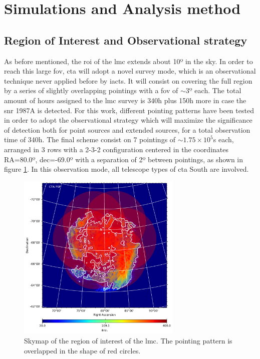 \documentclass{article}
\begin{document}
\section{Simulations and Analysis method} \label{sec:simana}

    \subsection{Region of Interest and Observational strategy}

As before mentioned, the  \gls{roi} of the \gls{lmc} extends about 10º in the sky. In order to reach this large \gls{fov}, \gls{cta} will adopt a novel survey mode, which is an observational technique never applied before by \glspl{iact}. It will consist on covering the full region by a series of slightly overlapping pointings with a \gls{fov} of $\sim 3º$ each. The total amount of hours assigned to the \gls{lmc} survey is 340h plus 150h more in case the \gls{snr} 1987A is detected. For this work, different pointing patterns have been tested in order to adopt the observational strategy which will maximize the significance of detection both for point sources and extended sources, for a total observation time of 340h. The final scheme consist on 7 pointings of $\sim 1.75 \times 10^5$s each, arranged in 3 rows with a 2-3-2 configuration centered in the coordinates RA=80.0º, dec=-69.0º with a separation of 2º between pointings, as shown in figure \ref{fig:pointings}. In this observation mode, all telescope types of \gls{cta} South are involved.

\begin{figure}
  \centering
  \includegraphics[width=0.7\textwidth]{Pictures/lmc_hi_cdensity_flipped_plot_1000GeV_1TeV.pdf}
  \caption{\label{fig:pointings} Skymap of the region of interest of the \gls{lmc}. The pointing pattern is overlapped in the shape of red circles.}
\end{figure}
\end{document}
